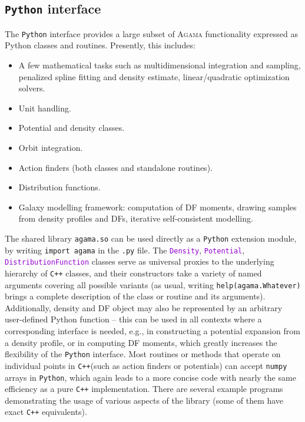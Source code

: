 \documentclass[12pt]{article}
\newcommand{\Agama}{\textsc{Agama}\xspace}
\newcommand{\Cpp}  {\texttt{C++}\xspace}
\newcommand{\Python}{\texttt{Python}\xspace}
\newcommand{\ttt}[1]{\textcolor{darkviolet}{\texttt{#1}}}
\begin{document}
\subsection{\Python interface}  \label{sec:Python}

The \Python interface provides a large subset of \Agama functionality expressed as Python classes and routines. Presently, this includes:
\begin{itemize}  \setlength{\parskip}{2pt} \setlength{\itemsep}{2pt}
\item A few mathematical tasks such as multidimensional integration and sampling, penalized spline fitting and density estimate, linear/quadratic optimization solvers.
\item Unit handling.
\item Potential and density classes.
\item Orbit integration.
\item Action finders (both classes and standalone routines).
\item Distribution functions.
\item Galaxy modelling framework: computation of DF moments, drawing samples from density profiles and DFs, iterative self-consistent modelling.
\end{itemize}

The shared library \texttt{agama.so} can be used directly as a \Python extension module, by writing \texttt{import agama} in the \texttt{.py} file. The \ttt{Density}, \ttt{Potential}, \ttt{DistributionFunction} classes serve as universal proxies to the underlying hierarchy of \Cpp classes, and their constructors take a variety of named arguments covering all possible variants (as usual, writing \texttt{help(agama.Whatever)} brings a complete description of the class or routine and its arguments). Additionally, density and DF object may also be represented by an arbitrary user-defined Python function -- this can be used in all contexts where a corresponding interface is needed, e.g., in constructing a potential expansion from a density profile, or in computing DF moments, which greatly increases the flexibility of the \Python interface. Most routines or methods that operate on individual points in \Cpp (such as action finders or potentials) can accept \texttt{numpy} arrays in \Python, which again leads to a more concise code with nearly the same efficiency as a pure \Cpp implementation. There are several example programs demonstrating the usage of various aspects of the library (some of them have exact \Cpp equivalents).
\end{document}
